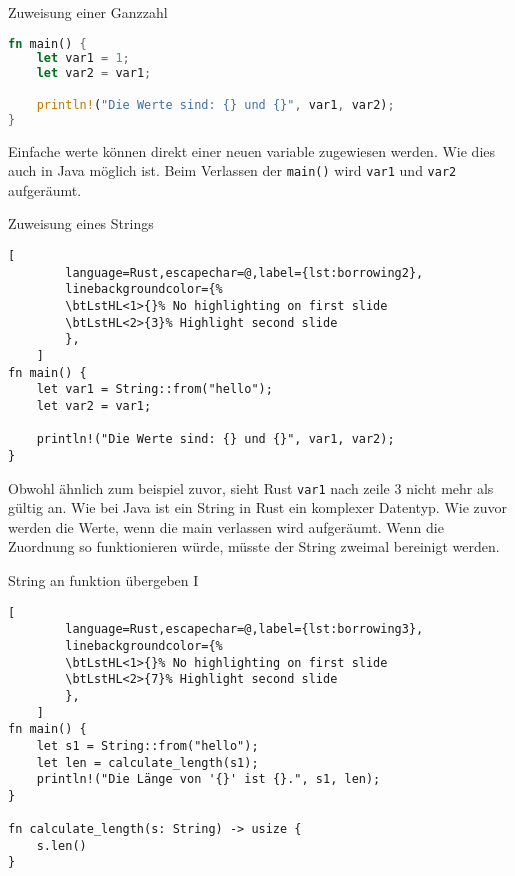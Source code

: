
\begin{frame}[fragile,t]{Zuweisung einer Ganzzahl}
    \begin{lstlisting}[language=Rust,escapechar=@,label={lst:borrowing1}]
fn main() {
    let var1 = 1;
    let var2 = var1;

    println!("Die Werte sind: {} und {}", var1, var2);
}\end{lstlisting}
    \pause
    Einfache werte können direkt einer neuen variable zugewiesen werden.
    Wie dies auch in Java möglich ist.
    Beim Verlassen der \texttt{main()} wird \texttt{var1} und \texttt{var2} aufgeräumt.
\end{frame}

\begin{frame}[fragile,t]{Zuweisung eines Strings}
    \begin{lstlisting}[
        language=Rust,escapechar=@,label={lst:borrowing2},
        linebackgroundcolor={%
        \btLstHL<1>{}% No highlighting on first slide
        \btLstHL<2>{3}% Highlight second slide
        },
    ]
fn main() {
    let var1 = String::from("hello");
    let var2 = var1;

    println!("Die Werte sind: {} und {}", var1, var2);
}\end{lstlisting}
    \pause
    Obwohl ähnlich zum beispiel zuvor, sieht Rust \texttt{var1} nach zeile 3 nicht mehr als gültig an.
    Wie bei Java ist ein String in Rust ein komplexer Datentyp.
    Wie zuvor werden die Werte, wenn die main verlassen wird aufgeräumt.
    Wenn die Zuordnung so funktionieren würde, müsste der String zweimal bereinigt werden.
\end{frame}

\begin{frame}[fragile,t]{String an funktion übergeben I}
    \begin{lstlisting}[
        language=Rust,escapechar=@,label={lst:borrowing3},
        linebackgroundcolor={%
        \btLstHL<1>{}% No highlighting on first slide
        \btLstHL<2>{7}% Highlight second slide
        },
    ]
fn main() {
    let s1 = String::from("hello");
    let len = calculate_length(s1);
    println!("Die Länge von '{}' ist {}.", s1, len);
}

fn calculate_length(s: String) -> usize {
    s.len()
}\end{lstlisting}
    \pause
\end{frame}

